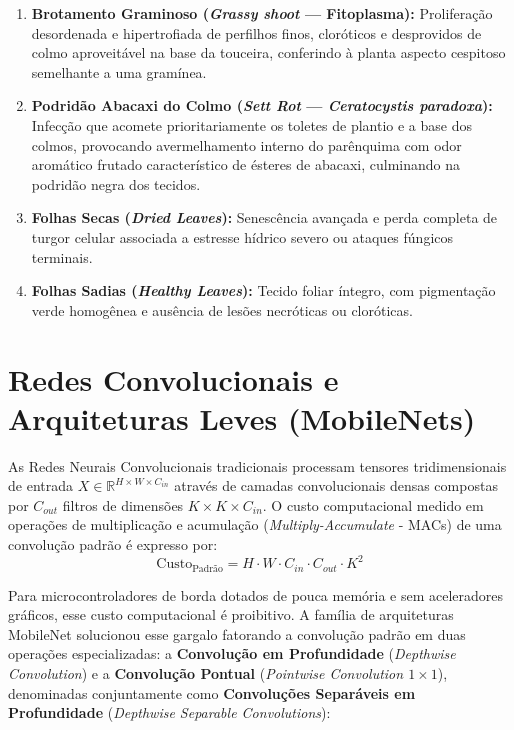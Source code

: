\begin{enumerate}
    \item \textbf{Brotamento Graminoso (\textit{Grassy shoot} — Fitoplasma):} Proliferação desordenada e hipertrofiada de perfilhos finos, cloróticos e desprovidos de colmo aproveitável na base da touceira, conferindo à planta aspecto cespitoso semelhante a uma gramínea.
    \item \textbf{Podridão Abacaxi do Colmo (\textit{Sett Rot} — \textit{Ceratocystis paradoxa}):} Infecção que acomete prioritariamente os toletes de plantio e a base dos colmos, provocando avermelhamento interno do parênquima com odor aromático frutado característico de ésteres de abacaxi, culminando na podridão negra dos tecidos.
    \item \textbf{Folhas Secas (\textit{Dried Leaves}):} Senescência avançada e perda completa de turgor celular associada a estresse hídrico severo ou ataques fúngicos terminais.
    \item \textbf{Folhas Sadias (\textit{Healthy Leaves}):} Tecido foliar íntegro, com pigmentação verde homogênea e ausência de lesões necróticas ou cloróticas.
\end{enumerate}

\section{Redes Convolucionais e Arquiteturas Leves (MobileNets)}

As Redes Neurais Convolucionais tradicionais processam tensores tridimensionais de entrada $X \in \mathbb{R}^{H \times W \times C_{in}}$ através de camadas convolucionais densas compostas por $C_{out}$ filtros de dimensões $K \times K \times C_{in}$. O custo computacional medido em operações de multiplicação e acumulação (\textit{Multiply-Accumulate} - MACs) de uma convolução padrão é expresso por:
\begin{equation}
\text{Custo}_{\text{Padrão}} = H \cdot W \cdot C_{in} \cdot C_{out} \cdot K^2
\label{eq:custo_conv_padrao}
\end{equation}

Para microcontroladores de borda dotados de pouca memória e sem aceleradores gráficos, esse custo computacional é proibitivo. A família de arquiteturas MobileNet \cite{howard2017mobilenets, sandler2018mobilenetv2} solucionou esse gargalo fatorando a convolução padrão em duas operações especializadas: a \textbf{Convolução em Profundidade} (\textit{Depthwise Convolution}) e a \textbf{Convolução Pontual} (\textit{Pointwise Convolution $1\times1$}), denominadas conjuntamente como \textbf{Convoluções Separáveis em Profundidade} (\textit{Depthwise Separable Convolutions}):


